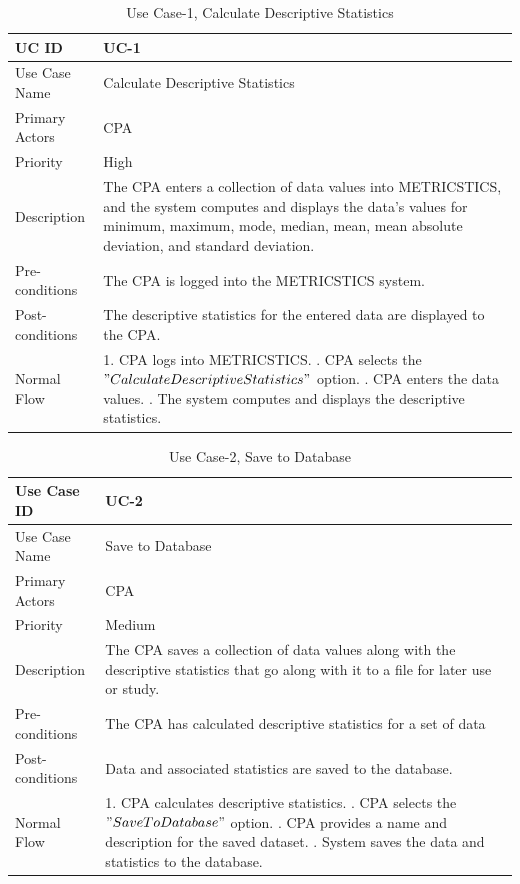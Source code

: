 \begin{table}[H]
\centering
\def\arraystretch{1.5}
\begin{tabular}{|l|p{4.4in}|}
\hline
\ac{UC} ID & UC-1\\ \hline
Use Case Name & Calculate Descriptive Statistics\\ \hline
Primary Actors & CPA\\ \hline
Priority & High\\ \hline
Description & The CPA enters a collection of data values into METRICSTICS, and the system computes and displays the data's values for minimum, maximum, mode, median, mean, mean absolute deviation, and standard deviation.\\ \hline
Pre-conditions & The CPA is logged into the METRICSTICS system.\\ \hline
Post-conditions & The descriptive statistics for the entered data are displayed to the CPA.\\ \hline
Normal Flow & 1. \ac{CPA} logs into METRICSTICS.
     \newline 2. CPA selects the $"Calculate Descriptive Statistics"$ option.
     \newline 3. CPA enters the data values.
     \newline 4. The system computes and displays the descriptive statistics.
    \\ \hline
\end{tabular}
\caption{Use Case-1, Calculate Descriptive Statistics}
\end{table}

\begin{table}[H]
\centering
\def\arraystretch{1.5}
\begin{tabular}{|l|p{4.5in}|}
\hline
Use Case ID & UC-2\\ \hline
Use Case Name & Save to Database\\ \hline
Primary Actors & CPA\\ \hline
Priority & Medium\\ \hline
Description & The CPA saves a collection of data values along with the descriptive \mbox{statistics} that go along with it to a file for later use or study.\\ \hline
Pre-conditions & The CPA has calculated descriptive statistics for a set of data\\ \hline
Post-conditions & Data and associated statistics are saved to the database.\\ \hline
Normal Flow & 1. CPA calculates descriptive statistics.
     \newline 2. CPA selects the $"Save To Database"$ option.
     \newline 3. CPA provides a name and description for the saved dataset.
     \newline 4. System saves the data and statistics to the database.
    \\ \hline
\end{tabular}
\caption{Use Case-2, Save to Database}
\end{table}

